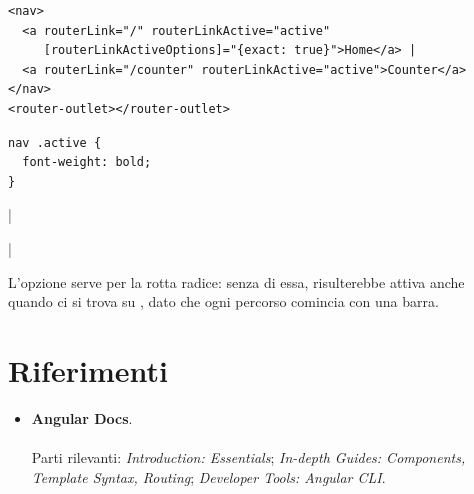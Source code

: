 \begin{affianco}[0.5][c]
\codicepiccolo
\begin{lstlisting}[style=html, name=app.component.html]
<nav>
  <a routerLink="/" routerLinkActive="active"
     [routerLinkActiveOptions]="{exact: true}">Home</a> |
  <a routerLink="/counter" routerLinkActive="active">Counter</a>
</nav>
<router-outlet></router-outlet>
\end{lstlisting}

\begin{lstlisting}[style=css]
nav .active {
  font-weight: bold;
}
\end{lstlisting}
\risultato
\begin{browser}[localhost:4200]
  \textbf{} | 
\end{browser}
\begin{browser}
   | \textbf{}
\end{browser}
\end{affianco}

L'opzione  serve per la rotta radice: senza di essa,
\code{/} risulterebbe attiva anche quando ci si trova su , dato
che ogni percorso comincia con una barra.

\section{Riferimenti}

\begin{itemize}
  \item \textbf{Angular Docs}. \\
         \\
        Parti rilevanti: \textit{Introduction: Essentials}; \textit{In-depth
        Guides: Components, Template Syntax, Routing}; \textit{Developer Tools:
        Angular CLI}.
\end{itemize}
